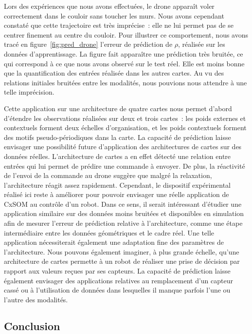 \documentclass[../main]{subfiles}
\begin{document}
Lors des expériences que nous avons effectuées, le drone apparaît voler correctement dans le couloir sans toucher les murs. Nous avons cependant constaté que cette trajectoire est très imprécise~: elle ne lui permet pas de se centrer finement au centre du couloir. Pour illustrer ce comportement, nous avons tracé en figure~\ref{fig:pred_drone} l'erreur de prédiction de $\rho$, réalisée sur les données d'apprentissage. La figure fait apparaître une prédiction très bruitée, ce qui correspond à ce que nous avons observé sur le test réel. Elle est moins bonne que la quantification des entrées réalisée dans les autres cartes. 
Au vu des relations initiales bruitées entre les modalités, nous pouvions nous attendre à une telle imprécision.

Cette application sur une architecture de quatre cartes nous permet d'abord d'étendre les observations réalisées sur deux et trois cartes~: les poids externes et contextuels forment deux échelles d'organisation, et les poids contextuels forment des motifs pseudo-périodiques dans la carte.
La capacité de prédiction laisse envisager une possibilité future d'application des architectures de cartes sur des données réelles. 
L'architecture de cartes a en effet détecté une relation entre entrées qui lui permet de prédire une commande à envoyer. De plus, la réactivité de l'envoi de la commande au drone suggère que malgré la relaxation, l'architecture réagit assez rapidement. Cependant, le dispositif expérimental réalisé ici reste à améliorer pour pouvoir envisager une réelle application de CxSOM au contrôle d'un robot. Dans ce sens, il serait intéressant d'étudier une application similaire sur des données moins bruitées et disponibles en simulation afin de mesurer l'erreur de prédiction relative à l'architecture, comme une étape intermédiaire entre les données géométriques et le cadre réel. Une telle application nécessiterait également une adaptation fine des paramètres de l'architecture.
Nous pouvons également imaginer, à plus grande échelle, qu'une architecture de cartes permette à un robot de réaliser une prise de décision par rapport aux valeurs reçues par ses capteurs. La capacité de prédiction laisse également envisager des applications relatives au remplacement d'un capteur cassé ou à l'utilisation de données dans lesquelles il manque parfois l'une ou l'autre des modalités.

\subsection{Conclusion}
\end{document}
